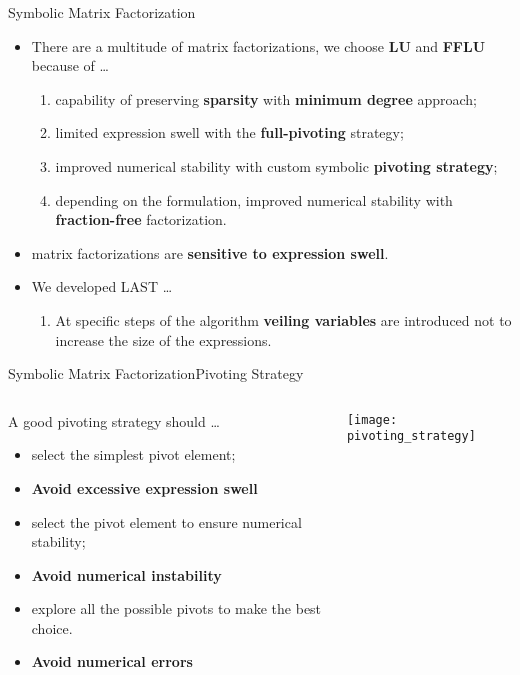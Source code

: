 \begin{frame}{Symbolic Matrix Factorization}
  \begin{itemize}
    \item There are a multitude of matrix factorizations, we choose \textbf{\ac{LU}} and \textbf{\ac{FFLU}} because of \dots
    \begin{enumerate}
      \item capability of preserving \textbf{sparsity} with \textbf{minimum degree} approach;
      \item limited expression swell with the \textbf{full-pivoting} strategy;
      \item improved numerical stability with custom symbolic \textbf{pivoting strategy};
      \item depending on the formulation, improved numerical stability with \textbf{fraction-free} factorization.
    \end{enumerate}
    \item \Maple{} matrix factorizations are \textbf{sensitive to expression swell}.
    \item We developed \ac{LAST} \dots
    \begin{enumerate}
      \item At specific steps of the algorithm \textbf{veiling variables} are introduced not to increase the size of the expressions.
    \end{enumerate}
  \end{itemize}
\end{frame}

\begin{frame}{Symbolic Matrix Factorization}{Pivoting Strategy}
  \begin{columns}
    \begin{column}[c]{0.5\textwidth}
      A good pivoting strategy should \dots
      \begin{itemize}
        \item select the simplest pivot element;
        \item[] \textbf{\small Avoid excessive expression swell}
        \item select the pivot element to ensure numerical stability;
        \item[] \textbf{\small Avoid numerical instability}
        \item explore all the possible pivots to make the best choice.
        \item[] \textbf{\small Avoid numerical errors}
      \end{itemize}
    \end{column}
    \begin{column}[c]{0.5\textwidth}
      \texttt{[image: pivoting\_strategy]}
    \end{column}
  \end{columns}
\end{frame}

